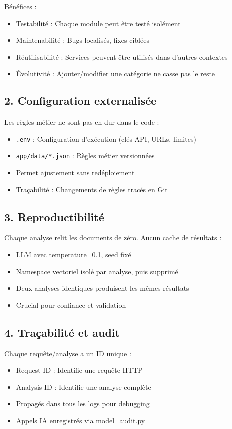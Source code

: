 \documentclass[12pt,a4paper,oneside]{book}
\begin{document}
Bénéfices :
\begin{itemize}
    \item Testabilité : Chaque module peut être testé isolément
    \item Maintenabilité : Bugs localisés, fixes ciblées
    \item Réutilisabilité : Services peuvent être utilisés dans d'autres contextes
    \item Évolutivité : Ajouter/modifier une catégorie ne casse pas le reste
\end{itemize}

\subsection{2. Configuration externalisée}

Les règles métier ne sont pas en dur dans le code :
\begin{itemize}
    \item \texttt{.env} : Configuration d'exécution (clés API, URLs, limites)
    \item \texttt{app/data/*.json} : Règles métier versionnées
    \item Permet ajustement sans redéploiement
    \item Traçabilité : Changements de règles tracés en Git
\end{itemize}

\subsection{3. Reproductibilité}

Chaque analyse relit les documents de zéro. Aucun cache de résultats :
\begin{itemize}
    \item LLM avec temperature=0.1, seed fixé
    \item Namespace vectoriel isolé par analyse, puis supprimé
    \item Deux analyses identiques produisent les mêmes résultats
    \item Crucial pour confiance et validation
\end{itemize}

\subsection{4. Traçabilité et audit}

Chaque requête/analyse a un ID unique :
\begin{itemize}
    \item Request ID : Identifie une requête HTTP
    \item Analysis ID : Identifie une analyse complète
    \item Propagés dans tous les logs pour debugging
    \item Appels IA enregistrés via model\_audit.py
\end{itemize}
\end{document}
